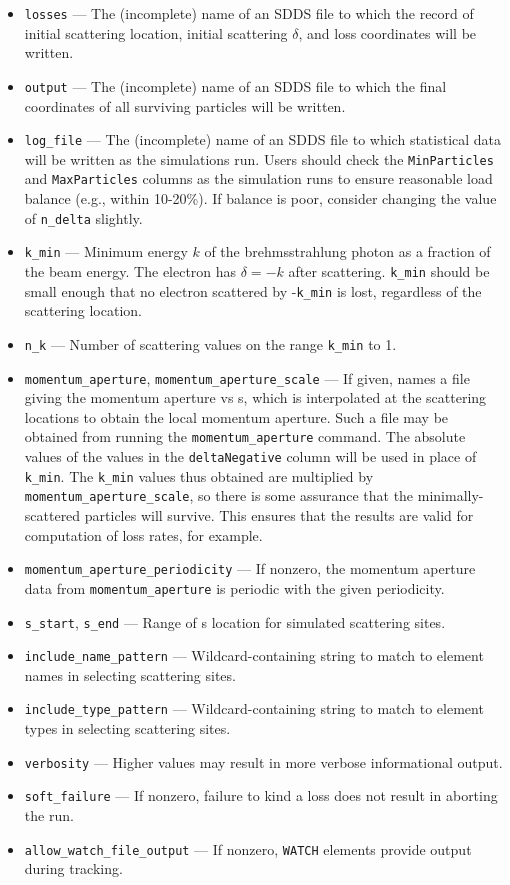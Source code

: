 \documentclass[11pt]{article}
\begin{document}
\begin{itemize}
\item \verb|losses| --- The (incomplete) name of an SDDS file to which the record of initial scattering location,
  initial scattering $\delta$, and loss coordinates will be written.
\item \verb|output| --- The (incomplete) name of an SDDS file to which the final coordinates of all surviving particles
  will be written.
\item \verb|log_file| --- The (incomplete) name of an SDDS file to which statistical data will be written as the simulations
  run. Users should check the \verb|MinParticles| and \verb|MaxParticles| columns as the simulation runs to ensure
  reasonable load balance (e.g., within 10-20\%). If balance is poor, consider changing the value of \verb|n_delta|
  slightly. 
\item \verb|k_min| --- Minimum energy $k$ of the brehmsstrahlung photon as a fraction of the beam energy.
  The electron has $\delta = -k$ after scattering.
  \verb|k_min| should be small enough that no electron scattered by -\verb|k_min| is lost, 
  regardless of the scattering location. 
\item \verb|n_k| --- Number of scattering values on the range \verb|k_min| to 1.
\item \verb|momentum_aperture|, \verb|momentum_aperture_scale| --- If given, names a file giving the momentum aperture vs s, which
  is interpolated at the scattering locations to obtain the local momentum aperture.
  Such a file may be obtained from running the \verb|momentum_aperture| command. The absolute values of the 
  values in the \verb|deltaNegative| column will be used in place of \verb|k_min|. 
  The \verb|k_min| values thus obtained are multiplied by \verb|momentum_aperture_scale|, so there is some assurance
  that the minimally-scattered particles will survive. This ensures that the results are valid for computation of 
  loss rates, for example.
\item \verb|momentum_aperture_periodicity| --- If nonzero, the momentum aperture data from \verb|momentum_aperture| is
  periodic with the given periodicity.
\item \verb|s_start|, \verb|s_end| --- Range of s location for simulated scattering sites.
\item \verb|include_name_pattern| --- Wildcard-containing string to match to element names in selecting scattering sites.
\item \verb|include_type_pattern| --- Wildcard-containing string to match to element types in selecting scattering sites.
\item \verb|verbosity| --- Higher values may result in more verbose informational output.
\item \verb|soft_failure| --- If nonzero, failure to kind a loss does not result in aborting the run.
\item \verb|allow_watch_file_output| --- If nonzero, \verb|WATCH| elements provide output during tracking. 
\end{itemize}
\end{document}
